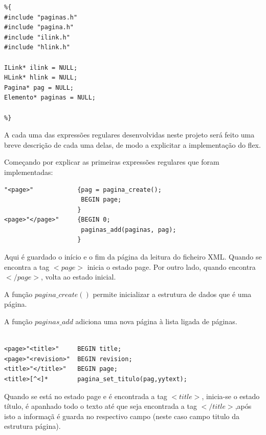 \documentclass[11pt, a4paper, oneside]{article}
\begin{document}
\begin{verbatim}
%{
#include "paginas.h"
#include "pagina.h"
#include "ilink.h"
#include "hlink.h"

ILink* ilink = NULL;
HLink* hlink = NULL;
Pagina* pag = NULL;
Elemento* paginas = NULL;

%}

\end{verbatim}
A cada uma das expressões regulares desenvolvidas neste projeto será feito uma breve descrição de cada uma delas, de modo a explicitar a implementação do flex.

Começando por explicar as primeiras expressões regulares que foram implementadas: 


\begin{verbatim}
"<page>"            {pag = pagina_create();
                     BEGIN page;
                    }
<page>"</page>"     {BEGIN 0;
                     paginas_add(paginas, pag);
                    }
\end{verbatim}

Aqui é guardado o início e o fim da página da leitura do ficheiro XML. Quando se encontra a tag \begin{math}<page>\end{math} inicia o estado page. Por outro lado, quando encontra \begin{math}</page>\end{math}, volta ao estado inicial. 


A função \begin{math}pagina\_create()\end{math} permite inicializar a estrutura de dados que é uma página.

A função \begin{math}paginas\_add\end{math} adiciona uma nova página à lista ligada de páginas.

\begin{verbatim}

<page>"<title>"     BEGIN title;
<page>"<revision>"  BEGIN revision;
<title>"</title>"   BEGIN page;
<title>[^<]*        pagina_set_titulo(pag,yytext);

\end{verbatim}

Quando se está no estado page e é encontrada a tag \begin{math}<title>\end{math}, inicia-se o estado título, é apanhado todo o texto até que seja encontrada a tag \begin{math}</title>\end{math},após isto a informaçã é guarda no respectivo campo (neste caso campo titulo da estrutura página).
\end{document}
